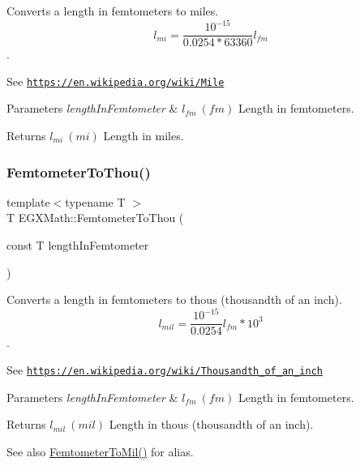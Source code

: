Converts a length in femtometers to miles. \[ l_{mi}=\frac{10^{-15}}{0.0254 * 63360} l_{fm} \]. 

See \href{https://en.wikipedia.org/wiki/Mile}{\tt https\+://en.\+wikipedia.\+org/wiki/\+Mile} 
\begin{DoxyParams}{Parameters}
{\em length\+In\+Femtometer} & $ l_{fm}\ (fm)$ Length in femtometers. \\
\hline
\end{DoxyParams}
\begin{DoxyReturn}{Returns}
$ l_{mi}\ (mi)$ Length in miles. 
\end{DoxyReturn}
\mbox{\label{group___e_g_x_math-_conversions-_length_conversions-_s_i-_femtometer-_imperial_ga5c277d07215ad164ba2ad94e25b02ff1}} 
\subsubsection{\texorpdfstring{Femtometer\+To\+Thou()}{FemtometerToThou()}}
{\footnotesize\ttfamily template$<$typename T $>$ \\
T E\+G\+X\+Math\+::\+Femtometer\+To\+Thou (\begin{DoxyParamCaption}\item[{const T}]{length\+In\+Femtometer }\end{DoxyParamCaption})}



Converts a length in femtometers to thous (thousandth of an inch). \[ l_{mil}= \frac{10^{-15}}{0.0254} l_{fm} * 10^{3} \]. 

See \href{https://en.wikipedia.org/wiki/Thousandth_of_an_inch}{\tt https\+://en.\+wikipedia.\+org/wiki/\+Thousandth\+\_\+of\+\_\+an\+\_\+inch} 
\begin{DoxyParams}{Parameters}
{\em length\+In\+Femtometer} & $ l_{fm}\ (fm)$ Length in femtometers. \\
\hline
\end{DoxyParams}
\begin{DoxyReturn}{Returns}
$ l_{mil}\ (mil)$ Length in thous (thousandth of an inch). 
\end{DoxyReturn}
\begin{DoxySeeAlso}{See also}
\mbox{\hyperlink{group___e_g_x_math-_conversions-_length_conversions-_s_i-_femtometer-_imperial_gacfcd599a1c2c834f3bbb5f3f991d55df}{Femtometer\+To\+Mil()}} for alias. 
\end{DoxySeeAlso}
\mbox{\label{group___e_g_x_math-_conversions-_length_conversions-_s_i-_femtometer-_imperial_ga4416c9d0cb07df4b86f23afe6b7f6e91}} 
